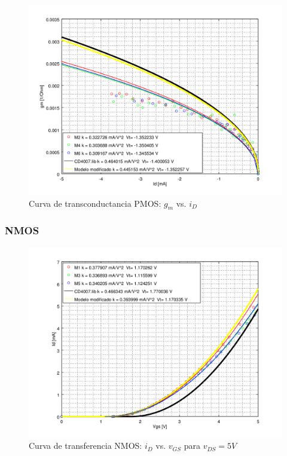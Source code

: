 \documentclass[10pt,spanish,a4paper,openany,notitlepage]{article}
\begin{document}
\begin{figure}[H] %
\begin{center}
\includegraphics[scale=0.65]{./octave/P_GM_ID.png}
\caption{Curva de transconductancia PMOS: $g_m$ vs. $i_D$}
 \label{fig:P_ID_VDS_500}
\end{center}
\end{figure}

\subsubsection{NMOS}

\begin{figure}[H] %
\begin{center}
\includegraphics[scale=0.65]{./octave/N_ID_VG.png}
\caption{Curva de transferencia NMOS: $i_D$ vs. $v_{GS}$ para $v_{DS} = 5 \unit{V}$}
 \label{fig:N_ID_VG}
\end{center}
\end{figure}
\end{document}
